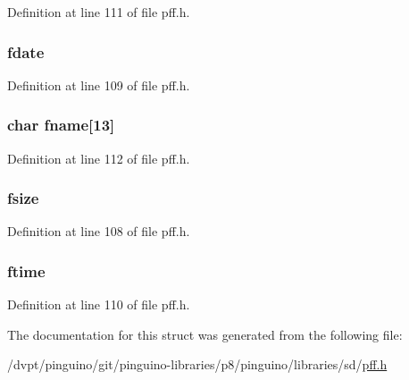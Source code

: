 Definition at line 111 of file pff.\-h.

\hypertarget{struct___f_i_l_i_n_f_o___a08bd6d7fd57525f52a5cf69a094aef92}{
\subsubsection[{fdate}]{ fdate}}\label{struct___f_i_l_i_n_f_o___a08bd6d7fd57525f52a5cf69a094aef92}


Definition at line 109 of file pff.\-h.

\hypertarget{struct___f_i_l_i_n_f_o___a892e7cf177f62142700c31c64dedb50b}{
\subsubsection[{fname}]{\setlength{\rightskip}{0pt plus 5cm}char fname\mbox{[}13\mbox{]}}}\label{struct___f_i_l_i_n_f_o___a892e7cf177f62142700c31c64dedb50b}


Definition at line 112 of file pff.\-h.

\hypertarget{struct___f_i_l_i_n_f_o___a41a315139292b6c76b0327509c3ac625}{
\subsubsection[{fsize}]{ fsize}}\label{struct___f_i_l_i_n_f_o___a41a315139292b6c76b0327509c3ac625}


Definition at line 108 of file pff.\-h.

\hypertarget{struct___f_i_l_i_n_f_o___af3c6c0f578435129300dd58488296abb}{
\subsubsection[{ftime}]{ ftime}}\label{struct___f_i_l_i_n_f_o___af3c6c0f578435129300dd58488296abb}


Definition at line 110 of file pff.\-h.



The documentation for this struct was generated from the following file\-:\begin{DoxyCompactItemize}
\item 
/dvpt/pinguino/git/pinguino-\/libraries/p8/pinguino/libraries/sd/\hyperlink{pff_8h}{pff.\-h}\end{DoxyCompactItemize}
